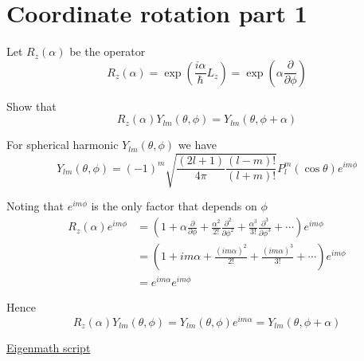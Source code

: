 

\section*{Coordinate rotation part 1}

Let $R_z(\alpha)$ be the operator
\begin{equation*}
R_z(\alpha)=\exp\left(\frac{i\alpha}{\hbar}L_z\right)
=\exp\left(\alpha\frac{\partial}{\partial\phi}\right)
\end{equation*}

Show that
\begin{equation*}
R_z(\alpha)Y_{lm}(\theta,\phi)=Y_{lm}(\theta,\phi+\alpha)
\tag{1}
\end{equation*}

For spherical harmonic $Y_{lm}(\theta,\phi)$ we have
\begin{equation*}
Y_{lm}(\theta,\phi)=(-1)^m\sqrt{\frac{(2l+1)}{4\pi}\frac{(l-m)!}{(l+m)!}}
P_l^m(\cos\theta)e^{im\phi}
\end{equation*}

Noting that $e^{im\phi}$ is the only factor that depends on $\phi$
\begin{align*}
R_z(\alpha)e^{im\phi}
&=\left(1+\alpha\frac{\partial}{\partial\phi}
+\frac{\alpha^2}{2!}\frac{\partial^2}{\partial\phi^2}
+\frac{\alpha^3}{3!}\frac{\partial^3}{\partial\phi^3}
+\cdots\right)e^{im\phi}
\\
&=\left(1+im\alpha
+\frac{(im\alpha)^2}{2!}
+\frac{(im\alpha)^3}{3!}
+\cdots\right)e^{im\phi}
\\
&=e^{im\alpha}e^{im\phi}
\end{align*}

Hence
\begin{equation*}
R_z(\alpha)Y_{lm}(\theta,\phi)=Y_{lm}(\theta,\phi)e^{im\alpha}=Y_{lm}(\theta,\phi+\alpha)
\end{equation*}

\href{https://georgeweigt.github.io/examples/coordinate-rotation-part-1-demo.html}{Eigenmath script}


